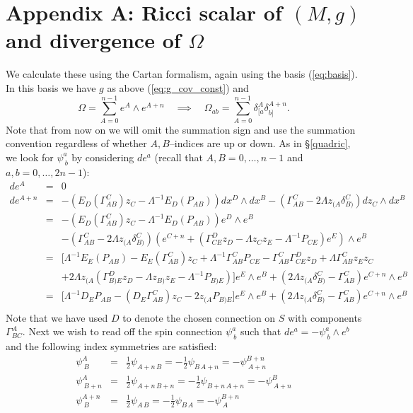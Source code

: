 \section{Appendix A: Ricci scalar of $(M,g)$ and divergence of $\Omega$}
We calculate these using the Cartan formalism, again using the basis
(\ref{eq:basis}). In this basis we have $g$ as above (\ref{eq:g_cov_const})
and
\[
\Omega=\sum_{A=0}^{n-1}e^{A}\wedge e^{A+n}\quad\implies\quad\Omega_{ab}=\sum_{A=0}^{n-1}\delta_{[a}^{A}\delta_{b]}^{A+n}.
\]
Note that from now on we will omit the summation sign and use the
summation convention regardless of whether $A, B$--indices are up or
down. As in \S \ref{quadric}, we look for $\psi_{\ b}^{a}$
by considering ${d}e^{a}$ (recall that $A,B=0,\dots,n-1$ and
$a,b=0,\dots,2n-1$):
\begin{eqnarray*}
{d}e^{A} & = & 0\\
{d}e^{A+n} & = & -(E_{D}(\Gamma_{AB}^{C})z_{C}-\Lambda^{-1}E_{D}(P_{AB})){d}x^{D}\wedge{d}x^{B}-(\Gamma_{AB}^{C}-2\Lambda z_{(A}\delta_{B)}^{C}){d}z_{C}\wedge{d}x^{B}\\
 & = & -(E_{D}(\Gamma_{AB}^{C})z_{C}-\Lambda^{-1}E_{D}(P_{AB}))e^{D}\wedge e^{B}\\
 &  & -(\Gamma_{AB}^{C}-2\Lambda z_{(A}\delta_{B)}^{C})(e^{C+n}+(\Gamma_{CE}^{D}z_{D}-\Lambda z_{C}z_{E}-\Lambda^{-1}P_{CE})e^{E})\wedge e^{B}\\
 & = & \bigl[\Lambda^{-1}E_{E}(P_{AB})-E_{E}(\Gamma_{AB}^{C})z_{C}+\Lambda^{-1}\Gamma_{AB}^{C}P_{CE}-\Gamma_{AB}^{C}\Gamma_{CE}^{D}z_{D}+\Lambda\Gamma_{AB}^{C}z_{E}z_{C}\\
 &  & +2\Lambda z_{(A}(\Gamma_{B)E}^{D}z_{D}-\Lambda z_{B)}z_{E}-\Lambda^{-1}P_{B)E})\bigr]e^{E}\wedge e^{B}+(2\Lambda z_{(A}\delta_{B)}^{C}-\Gamma_{AB}^{C})e^{C+n}\wedge e^{B}\\
 & = & \bigl[\Lambda^{-1}D_{E}P_{AB}-(D_{E}\Gamma_{AB}^{C})z_{C}-2z_{(A}P_{B)E}\bigr]e^{E}\wedge e^{B}+(2\Lambda z_{(A}\delta_{B)}^{C}-\Gamma_{AB}^{C})e^{C+n}\wedge e^{B}\\
\end{eqnarray*}
Note that we have used $D$ to denote the chosen connection on $S$
with components $\Gamma_{BC}^{A}$. Next we wish to read off the spin
connection $\psi_{\ b}^{a}$ such that ${d}e^{a}=-\psi_{\ b}^{a}\wedge e^{b}$
and the following index symmetries are satisfied:
\begin{eqnarray*}
\psi_{\ B}^{A} & = & \frac{1}{2}\psi_{A+n\, B}=-\frac{1}{2}\psi_{B\, A+n}=-\psi_{\ A+n}^{B+n}\\
\psi_{\ B+n}^{A} & = & \frac{1}{2}\psi_{A+n\, B+n}=-\frac{1}{2}\psi_{B+n\, A+n}=-\psi_{\ A+n}^{B}\\
\psi_{\ B}^{A+n} & = & \frac{1}{2}\psi_{A\, B}=-\frac{1}{2}\psi_{B\, A}=-\psi_{\ A}^{B+n}
\end{eqnarray*}
